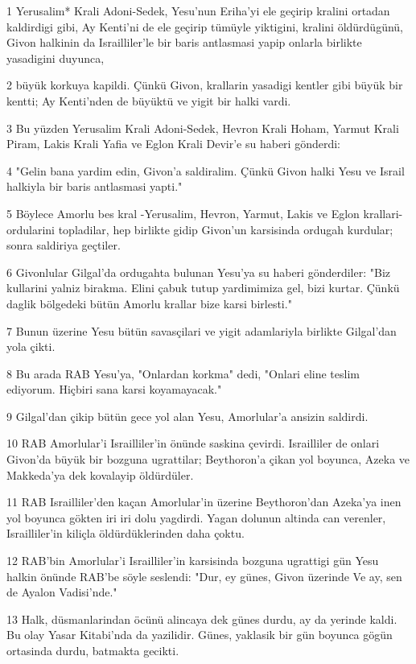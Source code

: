 \par 1 Yerusalim* Krali Adoni-Sedek, Yesu'nun Eriha'yi ele geçirip kralini ortadan kaldirdigi gibi, Ay Kenti'ni de ele geçirip tümüyle yiktigini, kralini öldürdügünü, Givon halkinin da Israilliler'le bir baris antlasmasi yapip onlarla birlikte yasadigini duyunca,
\par 2 büyük korkuya kapildi. Çünkü Givon, krallarin yasadigi kentler gibi büyük bir kentti; Ay Kenti'nden de büyüktü ve yigit bir halki vardi.
\par 3 Bu yüzden Yerusalim Krali Adoni-Sedek, Hevron Krali Hoham, Yarmut Krali Piram, Lakis Krali Yafia ve Eglon Krali Devir'e su haberi gönderdi:
\par 4 "Gelin bana yardim edin, Givon'a saldiralim. Çünkü Givon halki Yesu ve Israil halkiyla bir baris antlasmasi yapti."
\par 5 Böylece Amorlu bes kral -Yerusalim, Hevron, Yarmut, Lakis ve Eglon krallari- ordularini topladilar, hep birlikte gidip Givon'un karsisinda ordugah kurdular; sonra saldiriya geçtiler.
\par 6 Givonlular Gilgal'da ordugahta bulunan Yesu'ya su haberi gönderdiler: "Biz kullarini yalniz birakma. Elini çabuk tutup yardimimiza gel, bizi kurtar. Çünkü daglik bölgedeki bütün Amorlu krallar bize karsi birlesti."
\par 7 Bunun üzerine Yesu bütün savasçilari ve yigit adamlariyla birlikte Gilgal'dan yola çikti.
\par 8 Bu arada RAB Yesu'ya, "Onlardan korkma" dedi, "Onlari eline teslim ediyorum. Hiçbiri sana karsi koyamayacak."
\par 9 Gilgal'dan çikip bütün gece yol alan Yesu, Amorlular'a ansizin saldirdi.
\par 10 RAB Amorlular'i Israilliler'in önünde saskina çevirdi. Israilliler de onlari Givon'da büyük bir bozguna ugrattilar; Beythoron'a çikan yol boyunca, Azeka ve Makkeda'ya dek kovalayip öldürdüler.
\par 11 RAB Israilliler'den kaçan Amorlular'in üzerine Beythoron'dan Azeka'ya inen yol boyunca gökten iri iri dolu yagdirdi. Yagan dolunun altinda can verenler, Israilliler'in kiliçla öldürdüklerinden daha çoktu.
\par 12 RAB'bin Amorlular'i Israilliler'in karsisinda bozguna ugrattigi gün Yesu halkin önünde RAB'be söyle seslendi: "Dur, ey günes, Givon üzerinde Ve ay, sen de Ayalon Vadisi'nde."
\par 13 Halk, düsmanlarindan öcünü alincaya dek günes durdu, ay da yerinde kaldi. Bu olay Yasar Kitabi'nda da yazilidir. Günes, yaklasik bir gün boyunca gögün ortasinda durdu, batmakta gecikti.
